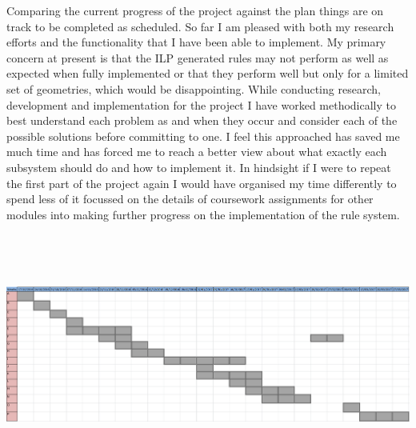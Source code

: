 \documentclass{article}
\begin{document}
Comparing the current progress of the project against the plan things are on track to be completed as scheduled. So far I am pleased with both my research efforts and the functionality that I have been able to implement. My primary concern at present is that the ILP generated rules may not perform as well as expected when fully implemented or that they perform well but only for a limited set of geometries, which would be disappointing. While conducting research, development and implementation for the project I have worked methodically to best understand each problem as and when they occur and consider each of the possible solutions before committing to one. I feel this approached has saved me much time and has forced me to reach a better view about what exactly each subsystem should do and how to implement it. In hindsight if I were to repeat the first part of the project again I would have organised my time differently to spend less of it focussed on the details of coursework assignments for other modules into making further progress on the implementation of the rule system.

\newpage
\pagestyle{empty}
\begin{landscape}
\vspace*{1cm}
\hspace*{-3cm}
\includegraphics[width =700px, height=300px]{TimePlanUpdated2.png} \par
\hspace*{-1cm}

\end{landscape}

\newpage
\end{document}
